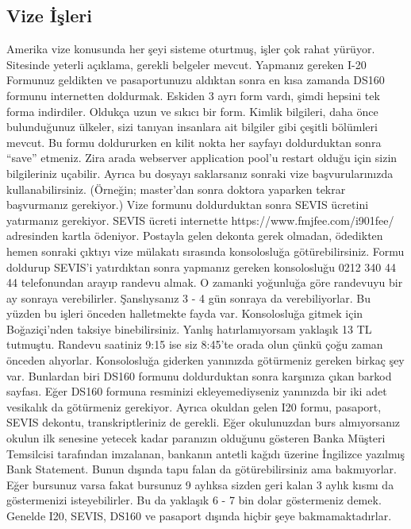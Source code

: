 \documentclass[12pt]{article}
\begin{document}
\subsection{Vize İşleri}
Amerika vize konusunda her şeyi sisteme oturtmuş, işler çok rahat yürüyor. Sitesinde yeterli açıklama, gerekli belgeler mevcut. Yapmanız gereken I-20 Formunuz geldikten ve pasaportunuzu aldıktan sonra en kısa zamanda DS160 formunu internetten doldurmak. Eskiden 3 ayrı form vardı, şimdi hepsini tek forma indirdiler. Oldukça uzun ve sıkıcı bir form. Kimlik bilgileri, daha önce bulunduğunuz ülkeler, sizi tanıyan insanlara ait bilgiler gibi çeşitli bölümleri mevcut. Bu formu doldururken en kilit nokta her sayfayı doldurduktan sonra “save” etmeniz. Zira arada webserver application pool’u restart olduğu için sizin bilgileriniz uçabilir. Ayrıca bu dosyayı saklarsanız sonraki vize başvurularınızda kullanabilirsiniz. (Örneğin; master’dan sonra doktora yaparken tekrar başvurmanız gerekiyor.) Vize formunu doldurduktan sonra SEVIS ücretini yatırmanız gerekiyor. SEVIS ücreti internette https://www.fmjfee.com/i901fee/ adresinden kartla ödeniyor. Postayla gelen dekonta gerek olmadan, ödedikten hemen sonraki çıktıyı vize mülakatı sırasında konsolosluğa götürebilirsiniz. Formu doldurup SEVIS’i yatırdıktan sonra yapmanız gereken konsolosluğu 0212 340 44 44 telefonundan arayıp randevu almak. O zamanki yoğunluğa göre randevuyu bir ay sonraya verebilirler. Şanslıysanız 3 - 4 gün sonraya da verebiliyorlar. Bu yüzden bu işleri önceden halletmekte fayda var. Konsolosluğa gitmek için Boğaziçi’nden taksiye binebilirsiniz. Yanlış hatırlamıyorsam yaklaşık 13 TL tutmuştu. Randevu saatiniz 9:15 ise siz 8:45’te orada olun çünkü çoğu zaman önceden alıyorlar. Konsolosluğa giderken yanınızda götürmeniz gereken birkaç şey var. Bunlardan biri DS160 formunu doldurduktan sonra karşınıza çıkan barkod sayfası. Eğer DS160 formuna resminizi ekleyemediyseniz yanınızda bir iki adet vesikalık da götürmeniz gerekiyor. Ayrıca okuldan gelen I20 formu, pasaport, SEVIS dekontu, transkriptleriniz de gerekli. Eğer okulunuzdan burs almıyorsanız okulun ilk senesine yetecek kadar paranızın olduğunu gösteren Banka Müşteri Temsilcisi tarafından imzalanan, bankanın antetli kağıdı üzerine İngilizce yazılmış Bank Statement. Bunun dışında tapu falan da götürebilirsiniz ama bakmıyorlar. Eğer bursunuz varsa fakat bursunuz 9 aylıksa sizden geri kalan 3 aylık kısmı da göstermenizi isteyebilirler. Bu da yaklaşık 6 - 7 bin dolar göstermeniz demek. Genelde I20, SEVIS, DS160 ve pasaport dışında hiçbir şeye bakmamaktadırlar.
%
%
%
\end{document}
